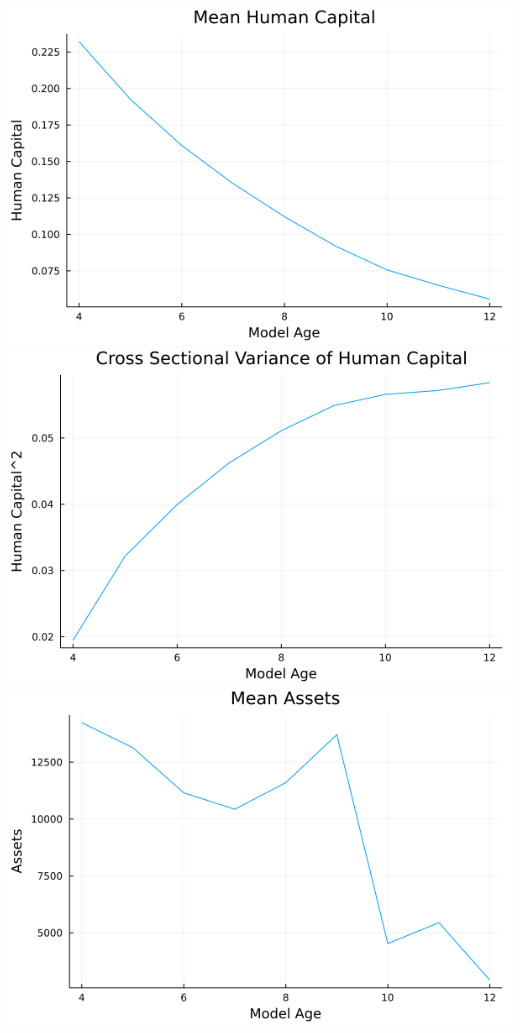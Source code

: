 \documentclass{article}
\begin{document}
\begin{enumerate}
\begin{center}
\includegraphics[scale =0.5]{mean_hc}
\includegraphics[scale =0.5]{var_hc}
\includegraphics[scale =0.5]{mean_assets}

\end{center}
\end{enumerate}
\end{document}
